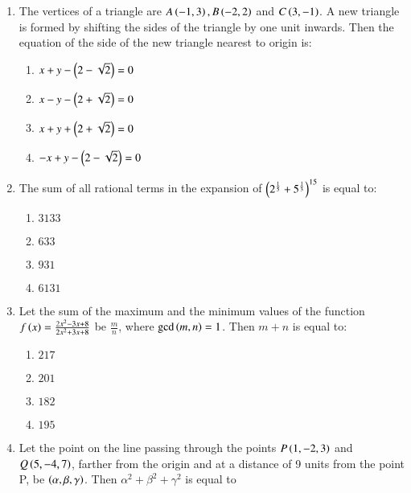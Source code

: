 \documentclass[journal]{IEEEtran}
\begin{document}
\begin{enumerate}
    \item The vertices of a triangle are $A\left(-1,3\right),B\left(-2,2\right)$ and $C\left(3,-1\right)$. A new triangle is formed by shifting the sides of the triangle by one unit inwards. Then the equation of the side of the new triangle nearest to origin is:

		\begin{multicols}{2}
			\begin{enumerate}
				\item $x+y-\left(2-\sqrt{2}\right)=0$
				\item $x-y-\left(2+\sqrt{2}\right)=0$
				\item $x+y+\left(2+\sqrt{2}\right)=0$
				\item $-x+y-\left(2-\sqrt{2}\right)=0$
			\end{enumerate}
		\end{multicols}

    \item The sum of all rational terms in the expansion of $\left(2^\frac{1}{5}+5^\frac{1}{3}\right)^{15}$ is equal to:

		\begin{multicols}{4}
			\begin{enumerate}
				\item $3133$
				\item $633$
				\item $931$
				\item $6131$
			\end{enumerate}
		\end{multicols}
  
    \item Let the sum of the maximum and the minimum values of the function $f\left(x\right)=\frac{2x^2-3x+8}{2x^2+3x+8}$ be $\frac{m}{n}$, where $\gcd\left(m,n\right)=1$. Then $m+n$ is equal to:

        \begin{multicols}{4}
            \begin{enumerate}
                \item $217$
                \item $201$
                \item $182$
                \item $195$
            \end{enumerate}
        \end{multicols}

    \item Let the point on the line passing through the points $P\left(1,-2,3\right)$ and $Q\left(5,-4,7\right)$, farther from the origin and at a distance of 9 units from the point P, be $\left(\alpha,\beta,\gamma\right)$. Then $\alpha^2+\beta^2+\gamma^2$ is equal to


\end{enumerate}
\end{document}
